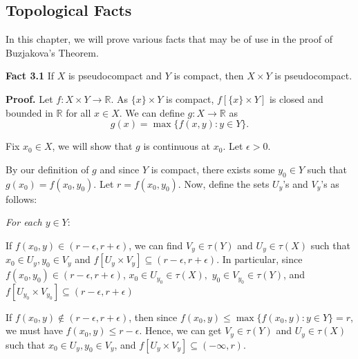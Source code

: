 \documentclass{article}
\begin{document}
			  \newpage














			  \begin{center}

			  \end{center}
			  \vskip 40pt
			  \begin{center}
			  \section{Topological Facts }
			  \end{center}
			  \vskip 20pt

			  In this chapter, we will prove various facts that may be of use in the proof of Buzjakova's Theorem.


			  \vskip 20pt
			  \textbf{Fact 3.1} If $X$ is pseudocompact and $Y$ is compact, then $X\times Y$ is pseudocompact. 

			  \vskip 15pt


			  \textbf{Proof.} Let $f: X\times Y \rightarrow \mathbb{R}$. As $\{x\}\times Y$ is compact, $f\left[ \{x\} \times Y\right] $ is 
			  closed and bounded in $\mathbb{R}$ for all $x \in X$. We can define $g:X \rightarrow \mathbb{R}$ as 
			  $$g(x)=\max \{f(x,y):y\in Y\}.$$

			  Fix $x_0 \in X$, we will show that $g$ is continuous at $x_0$. Let $\epsilon >0$. 

			  \vskip 10pt


			  By our definition of $g$ and since $Y$ is compact, there exists some $y_0\in Y$ such that $g(x_0)=f(x_0,y_0)$. Let $r=f(x_0,y_0)$. Now, define the sets $U_y$'s and $V_y$'s as follows:  \vskip 15pt

			  \emph{For each $y\in Y:$}
			  \vskip 5pt

			  If $f(x_0,y) \in (r-\epsilon, r+\epsilon)$, we can find $V_{y} \in \tau(Y) $ and $U_{y} \in \tau(X)$ such that $x_0\in U_y, y_0\in V_{y}$ and $f\left[U_y \times V_y\right] \subseteq (r-\epsilon, r+\epsilon)$. In particular, since $f(x_0,y_0) \in (r-\epsilon, r+\epsilon)$, $x_0\in U_{y_0}\in \tau(X),$ $y_0\in V_{y_0}\in \tau(Y)$, and $f\left[U_{y_0} \times V_{y_0}\right] \subseteq (r-\epsilon, r+\epsilon)$
			  \vskip 5pt

			  If $f(x_0,y) \notin (r-\epsilon, r+\epsilon)$, then since $f(x_0,y)\leq \max\{f(x_0,y):y\in Y\}=r$, we must have $f(x_0,y)\leq r-\epsilon$. Hence, we can get $V_{y} \in \tau(Y) $ and $U_{y} \in \tau(X)$ such that  $x_0\in U_y, y_0\in V_{y}$, and $f\left[U_y \times V_y\right] \subseteq (-\infty, r).$ \\
\end{document}
